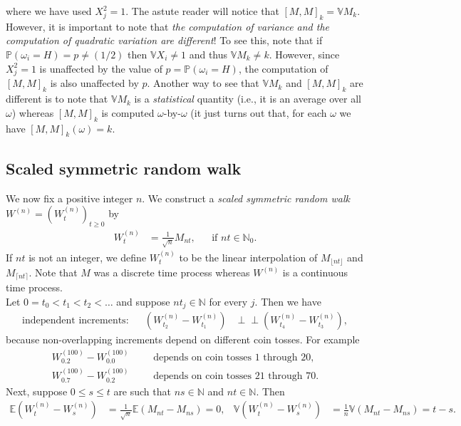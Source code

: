 \documentclass[12pt]{book}
\numberwithin{equation}{chapter}
\theoremstyle{plain}
\numberwithin{theorem}{section}
\theoremstyle{definition}
\numberwithin{exercise}{chapter}
\newcommand{\<}{\langle}
\renewcommand{\>}{\rangle}
\renewcommand{\(}{\left(}
\renewcommand{\)}{\right)}
\renewcommand{\[}{\left[}
\renewcommand{\]}{\right]}
\newcommand\Eb{\mathds{E}}
\newcommand\Pb{\mathds{P}}
\newcommand\Nb{\mathds{N}}
\newcommand\Vb{\mathds{V}}
\newcommand\om{\omega}
\newcommand{\ind}{\perp \! \! \! \perp}
\begin{document}
where we have used $X_j^2 = 1$.  The astute reader will notice that $[M,M]_k = \Vb M_k$.  However, it is important to note that \emph{the computation of variance and the computation of quadratic variation are different}!  To see this, note that if $\Pb(\om_i = H) = p \neq (1/2)$ then $\Vb X_i \neq 1$ and thus $\Vb M_k \neq k$.  However, since $X_j^2 = 1$ is unaffected by the value of $p = \Pb(\om_i=H)$, the computation of $[M,M]_k$ is also unaffected by $p$.  Another way to see that $\Vb M_k$ and $[M,M]_k$ are different is to note that $\Vb M_k$ is a \emph{statistical} quantity (i.e., it is an average over all $\om$) whereas $[M,M]_k$ is computed $\om$-by-$\om$ (it just turns out that, for each $\om$ we have $[M,M]_k(\om)=k$.  

\subsection{Scaled symmetric random walk}
We now fix a positive integer $n$.  We construct a \emph{scaled symmetric random walk} $W^{(n)} = (W_t^{(n)})_{t \geq 0}$ by
\begin{align}
W_t^{(n)}
	&=	\frac{1}{\sqrt{n}} M_{nt} , &
	&		\text{if $nt \in \Nb_0$}.
\end{align}
If $nt$ is not an integer, we define $W_t^{(n)}$ to be the linear interpolation of $M_{\lfloor nt \rfloor}$ and $M_{\lceil nt \rceil}$.  Note that $M$ was a discrete time process whereas $W^{(n)}$ is a continuous time process.
\\[0.5em]
Let $0 = t_0 < t_1 < t_2 < \ldots $ and suppose $n t_j \in \Nb$ for every $j$.  Then we have
\begin{align}
\text{independent increments}:&&
(W_{t_2}^{(n)} - W_{t_1}^{(n)})
	&\ind (W_{t_4}^{(n)} - W_{t_3}^{(n)}) ,
\end{align}
because non-overlapping increments depend on different coin tosses.  For example
\begin{align}
W_{0.2}^{(100)} - W_{0.0}^{(100)}&&
&\text{depends on coin tosses 1 through 20}, \\
W_{0.7}^{(100)} - W_{0.2}^{(100)}&&
&\text{depends on coin tosses 21 through 70} .
\end{align}
Next, suppose $0 \leq s \leq t$ are such that $ns \in \Nb$ and $nt \in \Nb$.  Then
\begin{align}
\Eb (W_t^{(n)} - W_s^{(n)} )
	&=	\frac{1}{\sqrt{n}} \Eb (M_{nt} - M_{ns})
	=		0 , &
\Vb (W_t^{(n)} - W_s^{(n)} )
	&=	\frac{1}{n} \Vb (M_{nt} - M_{ns})
	=		t-s. \label{eq:dW.mean.var}
\end{align}
\end{document}
